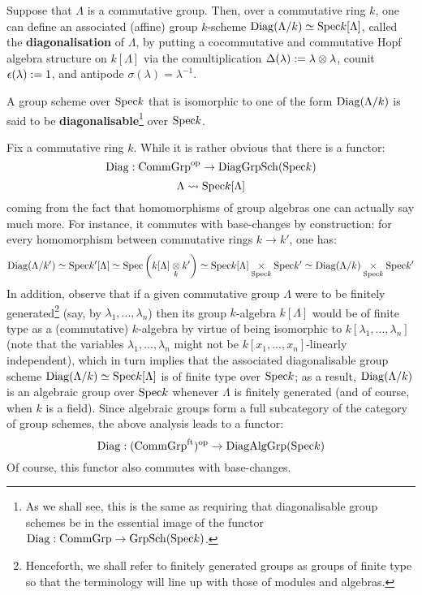            \begin{definition} \label{def: diagonalisable_group_schemes}
                Suppose that $\Lambda$ is a commutative group. Then, over a commutative ring $k$, one can define an associated (affine) group $k$-scheme $\mathrm{Diag}(\Lambda/k) \simeq \mathrm{Spec} k[\Lambda]$, called the \textbf{diagonalisation} of $\Lambda$, by putting a cocommutative and commutative Hopf algebra structure on $k[\Lambda]$ via the comultiplication $\Delta(\lambda) := \lambda \tensor \lambda$, counit $\epsilon(\lambda) := 1$, and antipode $\sigma(\lambda) = \lambda^{-1}$.
                
                A group scheme over $\mathrm{Spec} k$ that is isomorphic to one of the form $\mathrm{Diag}(\Lambda/k)$ is said to be \textbf{diagonalisable}\footnote{As we shall see, this is the same as requiring that diagonalisable group schemes be in the essential image of the functor $\mathrm{Diag}: \mathrm{Comm}\mathrm{Grp} \to \mathrm{Grp}\mathrm{Sch}(\mathrm{Spec} k)$.} over $\mathrm{Spec} k$.
            \end{definition}
            \begin{remark} \label{remark: diagonalisable_algebraic_groups}
                Fix a commutative ring $k$. While it is rather obvious that there is a functor:
                    $$\mathrm{Diag}: \mathrm{Comm}\mathrm{Grp}^{\mathrm{op}} \to \mathrm{Diag}\mathrm{Grp}\mathrm{Sch}(\mathrm{Spec} k)$$
                    $$\Lambda \leadsto \mathrm{Spec} k[\Lambda]$$
                coming from the fact that homomorphisms of group algebras one can actually say much more. For instance, it commutes with base-changes by construction: for every homomorphism between commutative rings $k \to k'$, one has:
                    $$\Diag(\Lambda/k') \cong \Spec k'[\Lambda] \cong \Spec \left(k[\Lambda] \tensor_k k'\right) \cong \Spec k[\Lambda] \x_{\Spec k} \Spec k' \cong \Diag(\Lambda/k) \x_{\Spec k} \Spec k'$$
                In addition, observe that if a given commutative group $\Lambda$ were to be finitely generated\footnote{Henceforth, we shall refer to finitely generated groups as groups of finite type so that the terminology will line up with those of modules and algebras.} (say, by $\lambda_1, ..., \lambda_n$) then its group $k$-algebra $k[\Lambda]$ would be of finite type as a (commutative) $k$-algebra by virtue of being isomorphic to $k[\lambda_1, ..., \lambda_n]$ (note that the variables $\lambda_1, ..., \lambda_n$ might not be $k[x_1, ..., x_n]$-linearly independent), which in turn implies that the associated diagonalisable group scheme $\mathrm{Diag}(\Lambda/k) \simeq \mathrm{Spec} k[\Lambda]$ is of finite type over $\mathrm{Spec} k$; as a result, $\mathrm{Diag}(\Lambda/k)$ is an algebraic group over $\mathrm{Spec} k$ whenever $\Lambda$ is finitely generated (and of course, when $k$ is a field). Since algebraic groups form a full subcategory of the category of group schemes, the above analysis leads to a functor:
                    $$\mathrm{Diag}: (\mathrm{Comm}\mathrm{Grp}^{\mathrm{ft}})^{\mathrm{op}} \to \mathrm{Diag}\mathrm{Alg}\mathrm{Grp}(\mathrm{Spec} k)$$
                Of course, this functor also commutes with base-changes. 
            \end{remark}
